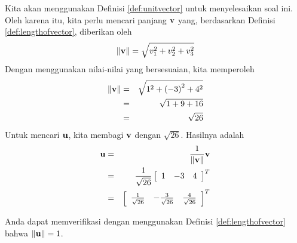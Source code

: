 \begin{solution}
Kita akan menggunakan Definisi \ref{def:unitvector} untuk menyelesaikan soal ini.
Oleh karena itu, kita perlu mencari panjang $\mathbf{v}$ yang, berdasarkan Definisi \ref{def:lengthofvector},
diberikan oleh
\begin{equation*}
\|
\mathbf{v}
\|
= \sqrt{ v_{1}^2 + v_{2}^2+ v_{3}^2}
\end{equation*}
Dengan menggunakan nilai-nilai yang bersesuaian, kita memperoleh
\begin{eqnarray*}
\|
\mathbf{v}
\|
&=& \sqrt{ 1^2 + \left(-3 \right)^2 + 4^2} \\
&=& \sqrt{ 1 + 9 + 16} \\
&=& \sqrt{26}
\end{eqnarray*}
Untuk mencari $\mathbf{u}$, kita membagi $\mathbf{v}$ dengan $\sqrt{26}$.
Hasilnya adalah
\begin{eqnarray*}
\mathbf{u}
&=&
\frac{1}{\| \mathbf{v} \|}
\mathbf{v} \\
&=&
\frac{1}{\sqrt{26}}
\left[
\begin{array}{rrr}
1 & -3 & 4
\end{array}
\right]^T \\
&=&
\left[
\begin{array}{rrr}
\frac{1}{\sqrt{26}} & -\frac{3}{\sqrt{26}} & \frac{4}{\sqrt{26}}
\end{array}
\right]^T
\end{eqnarray*}

Anda dapat memverifikasi dengan menggunakan Definisi \ref{def:lengthofvector} bahwa $\| \mathbf{u} \| = 1 $.
\end{solution}
